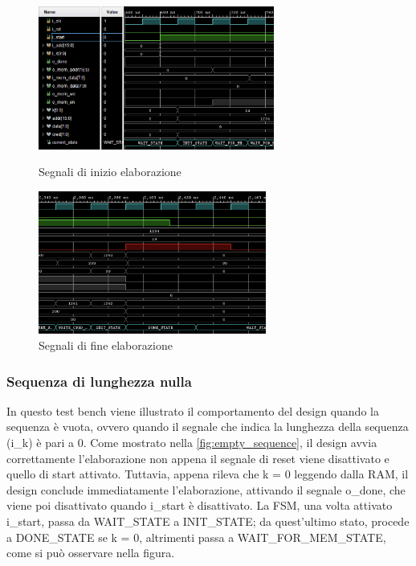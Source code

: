 \documentclass[11pt,a4paper]{article}
\begin{document}
\begin{figure}[htbp]
    \centering
    \begin{minipage}{0.5\textwidth}
        \centering
        \includegraphics[height=4.7cm]{resources/start_signal.png}
        \caption{Segnali di inizio elaborazione}
        \label{fig:start_signal}
    \end{minipage}\hfill
    \begin{minipage}{0.5\textwidth}
        \centering
        \includegraphics[height=4.7cm]{resources/end_signal.png}
        \caption{Segnali di fine elaborazione}
        \label{fig:end_signal}
    \end{minipage}
    \label{fig:normal_sequence}
\end{figure}

\subsubsection{Sequenza di lunghezza nulla}

In questo test bench viene illustrato il comportamento del design quando la sequenza è vuota, ovvero quando il segnale che indica la lunghezza della sequenza (i\_k) è pari a 0. Come mostrato nella \autoref{fig:empty_sequence}, il design avvia correttamente l'elaborazione non appena il segnale di reset viene disattivato e quello di start attivato. Tuttavia, appena rileva che k = 0 leggendo dalla RAM, il design conclude immediatamente l'elaborazione, attivando il segnale o\_done, che viene poi disattivato quando i\_start è disattivato. La FSM, una volta attivato i\_start, passa da WAIT\_STATE a INIT\_STATE; da quest'ultimo stato, procede a DONE\_STATE se k = 0, altrimenti passa a WAIT\_FOR\_MEM\_STATE, come si può osservare nella figura.
\end{document}
